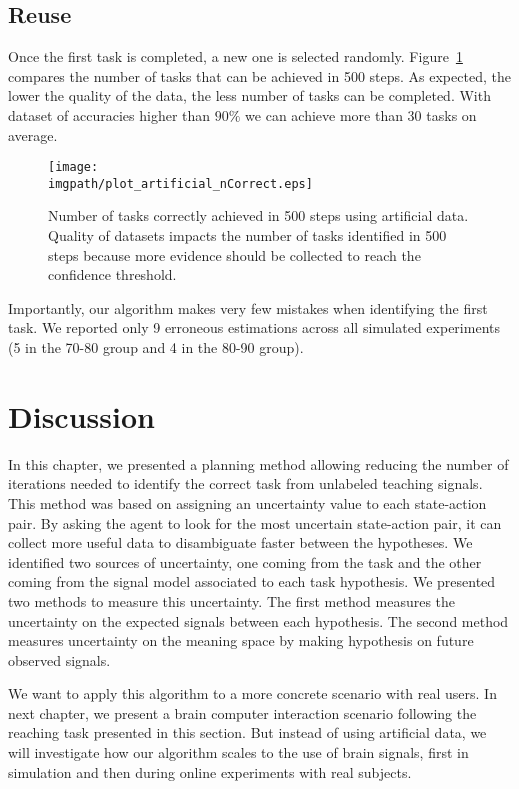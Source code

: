 \subsection{Reuse}

Once the first task is completed, a new one is selected randomly. Figure~\ref{fig:nCorrectArtificial} compares the number of tasks that can be achieved in 500 steps. As expected, the lower the quality of the data, the less number of tasks can be completed. With dataset of accuracies higher than $90\%$ we can achieve more than 30 tasks on average.

\begin{figure}[!htbp]
    \centering
    \texttt{[image: \\imgpath/plot\_artificial\_nCorrect.eps]}
    \caption{Number of tasks correctly achieved in 500 steps using artificial data. Quality of datasets impacts the number of tasks identified in 500 steps because more evidence should be collected to reach the confidence threshold.}
    \label{fig:nCorrectArtificial}
\end{figure} 

Importantly, our algorithm makes very few mistakes when identifying the first task. We reported only 9 erroneous estimations across all simulated experiments (5 in the 70-80 group and 4 in the 80-90 group).

\section{Discussion}

In this chapter, we presented a planning method allowing reducing the number of iterations needed to identify the correct task from unlabeled teaching signals. This method was based on assigning an uncertainty value to each state-action pair. By asking the agent to look for the most uncertain state-action pair, it can collect more useful data to disambiguate faster between the hypotheses. We identified two sources of uncertainty, one coming from the task and the other coming from the signal model associated to each task hypothesis. We presented two methods to measure this uncertainty. The first method measures the uncertainty on the expected signals between each hypothesis. The second method measures uncertainty on the meaning space by making hypothesis on future observed signals.

We want to apply this algorithm to a more concrete scenario with real users. In next chapter, we present a brain computer interaction scenario following the reaching task presented in this section. But instead of using artificial data, we will investigate how our algorithm scales to the use of brain signals, first in simulation and then during online experiments with real subjects.



